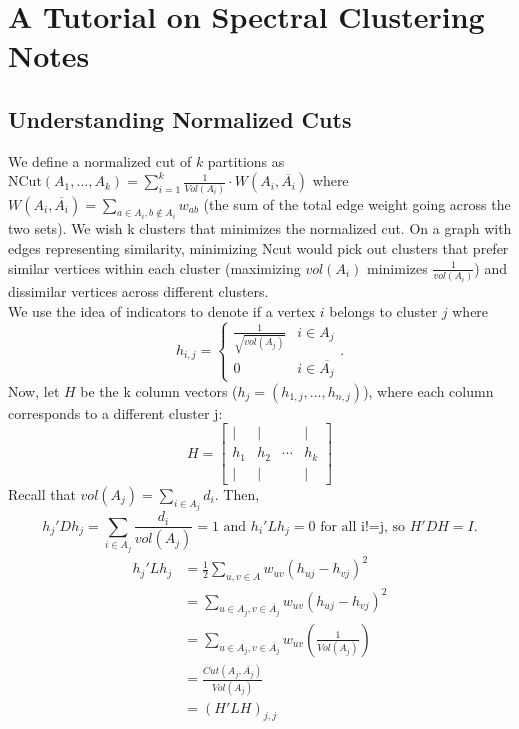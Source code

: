 \documentclass{article}
\begin{document}
\section{A Tutorial on Spectral Clustering Notes}

\subsection{Understanding Normalized Cuts}


We define a normalized cut of $k$ partitions as $\text{NCut}(A_1, ..., A_k) = \sum_{i=1}^{k} \frac{1}{Vol(A_i)} \cdot W(A_i, \overline{A_i})$ where $W(A_i, \overline{A_i}) = \sum_{a \in A_i, b \notin A_i} w_{ab}$ (the sum of the total edge weight going across the two sets). We wish k clusters that minimizes the normalized cut. On a graph with edges representing similarity, minimizing Ncut would pick out clusters that prefer similar vertices within each cluster (maximizing $vol(A_i)$ minimizes $\frac{1}{vol(A_i)}$) and dissimilar vertices across different clusters. \\[1em]
We use the idea of indicators to denote if a vertex $i$ belongs to cluster $j$ where \[h_{i,j} = \begin{cases}
                     \frac{1}{\sqrt{vol(A_j)}} & i \in A_j \\
                     0 & i \in \overline{A_j}
                     \end{cases}.\] 
Now, let $H$ be the k column vectors ($h_j = (h_{1,j}, ..., h_{n,j})$), where each column corresponds to a different cluster j: 
\[
H = \begin{bmatrix}
    \vert & \vert &  & \vert\\
    h_1   & h_2 &  \dotsb & h_k\\
    \vert & \vert & & \vert
\end{bmatrix}
\] \bigskip
Recall that $vol(A_j) = \sum_{i \in A_j} d_i$. Then, 
\[h_j' D h_j = \sum_{i \in A_j}\frac{d_i}{vol(A_j)} = 1 \text{ and } h_i'Lh_j = 0  \text{ for all i!=j,  so } H'DH = I. \]
\begin{align*}
    h_j'Lh_j &= \frac{1}{2} \sum_{u,v \in A} w_{uv}(h_{uj} - h_{vj})^2 \\
             &= \sum_{u \in A_j, v \in \overline{A_j}} w_{uv}(h_{uj} - h_{vj})^2 \\
             &= \sum_{u \in A_j, v \in \overline{A_j}} w_{uv} (\frac{1}{Vol(A_j)}) \\ 
             &= \frac{Cut(A_j, \overline{A_j})}{Vol(A_j)} \\
             &= (H'LH)_{j,j}
\end{align*}
\end{document}
